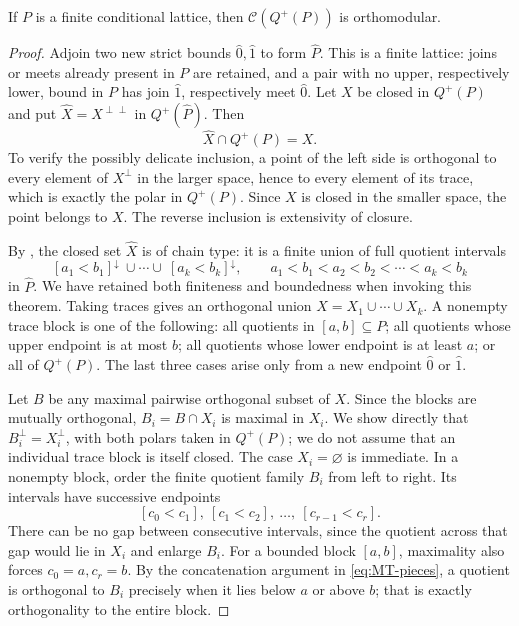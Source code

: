 \begin{lemma}
\label{SA21-A27a}
If $P$ is a finite conditional lattice, then $\mathcal C(Q^+(P))$
is orthomodular.
\end{lemma}
\begin{proof}
Adjoin two new strict bounds $\widehat0,\widehat1$ to form
$\widehat P$. This is a finite lattice: joins or meets already present
in $P$ are retained, and a pair with no upper, respectively lower,
bound in $P$ has join $\widehat1$, respectively meet $\widehat0$.
Let $X$ be closed in $Q^+(P)$ and put
$\widehat X=X^{\perp\perp}$ in $Q^+(\widehat P)$.
Then
\begin{equation}
 \label{eq:MT-trace}
 \widehat X\cap Q^+(P)=X.
\end{equation}
To verify the possibly delicate inclusion, a point of the left side
is orthogonal to every element of $X^{\perp}$ in the larger space,
hence to every element of its trace, which is exactly the polar in
$Q^+(P)$. Since $X$ is closed in the smaller space, the point belongs
to $X$. The reverse inclusion is extensivity of closure.

By \citet[Theorem~4.10(a)$\Rightarrow$(b), p.~10]{Jenca2022}, the
closed set $\widehat X$ is of chain type: it is a finite union of
full quotient intervals
\[
 [a_1<b_1]^{\downarrow}\ \cup\cdots\cup\
 [a_k<b_k]^{\downarrow},
 \qquad a_1<b_1<a_2<b_2<\cdots<a_k<b_k
\]
in $\widehat P$. We have retained both finiteness and boundedness
when invoking this theorem. Taking traces gives an orthogonal union
$X=X_1\cup\cdots\cup X_k$. A nonempty trace block is one of the
following: all quotients in $[a,b]\subseteq P$; all quotients whose
upper endpoint is at most $b$; all quotients whose lower endpoint is
at least $a$; or all of $Q^+(P)$. The last three cases arise only from
a new endpoint $\widehat0$ or $\widehat1$.

Let $B$ be any maximal pairwise orthogonal subset of $X$. Since the
blocks are mutually orthogonal, $B_i=B\cap X_i$ is maximal in $X_i$.
We show directly that $B_i^{\perp}=X_i^{\perp}$, with both polars
taken in $Q^+(P)$; we do not assume that an individual trace block
is itself closed. The case $X_i=\varnothing$ is immediate. In a
nonempty block, order the finite quotient family $B_i$ from left to
right. Its intervals have successive endpoints
\[
 [c_0<c_1],\ [c_1<c_2],\ \ldots,\ [c_{r-1}<c_r].
\]
There can be no gap between consecutive intervals, since the quotient
across that gap would lie in $X_i$ and enlarge $B_i$.
For a bounded block $[a,b]$, maximality also forces $c_0=a,c_r=b$.
By the concatenation argument in \eqref{eq:MT-pieces}, a quotient is
orthogonal to $B_i$ precisely when it lies below $a$ or above $b$;
that is exactly orthogonality to the entire block.


\end{proof}
